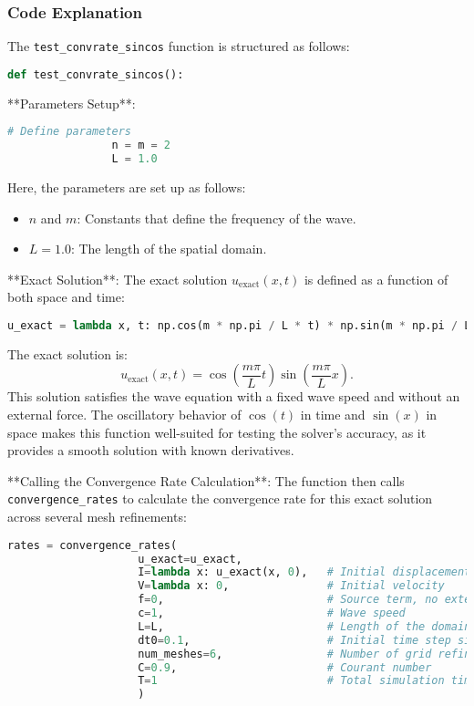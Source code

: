 \documentclass{article}
\begin{document}
			\subsubsection{Code Explanation}
			
			The \texttt{test\_convrate\_sincos} function is structured as follows:
			
			\begin{lstlisting}[language=Python]
				def test_convrate_sincos():
			\end{lstlisting}
			
			**Parameters Setup**:
			\begin{lstlisting}[language=Python]
				# Define parameters
				n = m = 2
				L = 1.0
			\end{lstlisting}
			
			Here, the parameters are set up as follows:
			\begin{itemize}
				\item \( n \) and \( m \): Constants that define the frequency of the wave.
				\item \( L = 1.0 \): The length of the spatial domain.
			\end{itemize}
			
			**Exact Solution**:
			The exact solution \( u_{\text{exact}}(x, t) \) is defined as a function of both space and time:
			\begin{lstlisting}[language=Python]
				u_exact = lambda x, t: np.cos(m * np.pi / L * t) * np.sin(m * np.pi / L * x)
			\end{lstlisting}
			
			The exact solution is:
			\[
			u_{\text{exact}}(x, t) = \cos\left(\frac{m \pi}{L} t\right) \sin\left(\frac{m \pi}{L} x\right).
			\]
			This solution satisfies the wave equation with a fixed wave speed and without an external force. The oscillatory behavior of \( \cos(t) \) in time and \( \sin(x) \) in space makes this function well-suited for testing the solver’s accuracy, as it provides a smooth solution with known derivatives.
			
			**Calling the Convergence Rate Calculation**:
			The function then calls \texttt{convergence\_rates} to calculate the convergence rate for this exact solution across several mesh refinements:
			\begin{lstlisting}[language=Python]
				rates = convergence_rates(
					u_exact=u_exact,
					I=lambda x: u_exact(x, 0),   # Initial displacement
					V=lambda x: 0,               # Initial velocity
					f=0,                         # Source term, no external force
					c=1,                         # Wave speed
					L=L,                         # Length of the domain
					dt0=0.1,                     # Initial time step size
					num_meshes=6,                # Number of grid refinements
					C=0.9,                       # Courant number
					T=1                          # Total simulation time
					)
			\end{lstlisting}
			
\end{document}
